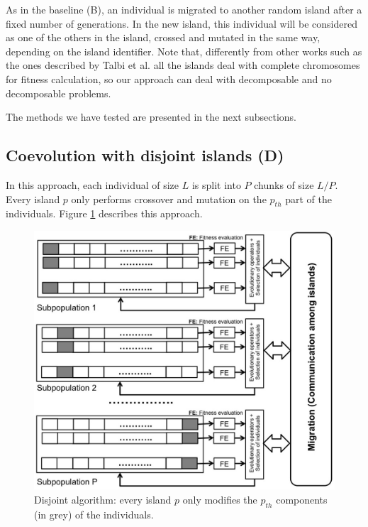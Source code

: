 \documentclass[preprint]{elsarticle}
\begin{document}
As in the baseline (B), an individual is migrated to another random
island after a fixed number of generations. In the new island, this
individual will be considered as one of the others in the island,
crossed and mutated in the same way, depending on the island
identifier. Note that, differently from other works such as the ones
described by Talbi et al. \citep{Talbi08Parallel} all the islands deal
with complete chromosomes for fitness calculation, so our approach can
deal with decomposable and no decomposable problems. %

The methods we have tested are presented in the next subsections. 

\subsection{Coevolution with disjoint islands (D)} 
In this approach, each individual of size $L$ is split into $P$ chunks
of size $L/P$. Every island $p$ only performs crossover and mutation
on the $p_{th}$ part of the individuals. Figure \ref{fig:disjoint}
describes this approach.   
%
\begin{figure}[h!tb]
\centering
\includegraphics[width=12cm]{islandDisjoint.jpg}
\caption{Disjoint algorithm: every island $p$ only modifies the $p_{th}$ components (in grey) of the individuals.}
\label{fig:disjoint}
\end{figure}
\end{document}
